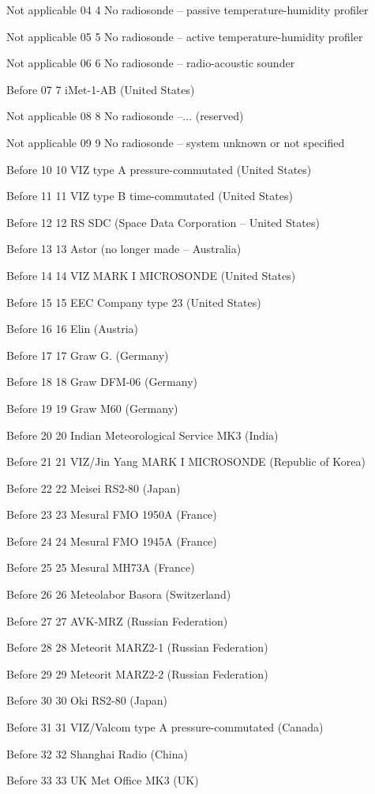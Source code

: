 Not applicable 04 4 No radiosonde -- passive temperature-humidity profiler

Not applicable 05 5 No radiosonde -- active temperature-humidity profiler

Not applicable 06 6 No radiosonde -- radio-acoustic sounder

Before 07 7 iMet-1-AB (United States)

Not applicable 08 8 No radiosonde --... (reserved)

Not applicable 09 9 No radiosonde -- system unknown or not specified

Before 10 10 VIZ type A pressure-commutated (United States)

Before 11 11 VIZ type B time-commutated (United States)

Before 12 12 RS SDC (Space Data Corporation -- United States)

Before 13 13 Astor (no longer made -- Australia)

Before 14 14 VIZ MARK I MICROSONDE (United States)

Before 15 15 EEC Company type 23 (United States)

Before 16 16 Elin (Austria)

Before 17 17 Graw G. (Germany)

Before 18 18 Graw DFM-06 (Germany)

Before 19 19 Graw M60 (Germany)

Before 20 20 Indian Meteorological Service MK3 (India)

Before 21 21 VIZ/Jin Yang MARK I MICROSONDE (Republic of Korea)

Before 22 22 Meisei RS2-80 (Japan)

Before 23 23 Mesural FMO 1950A (France)

Before 24 24 Mesural FMO 1945A (France)

Before 25 25 Mesural MH73A (France)

Before 26 26 Meteolabor Basora (Switzerland)

Before 27 27 AVK-MRZ (Russian Federation)

Before 28 28 Meteorit MARZ2-1 (Russian Federation)

Before 29 29 Meteorit MARZ2-2 (Russian Federation)

Before 30 30 Oki RS2-80 (Japan)

Before 31 31 VIZ/Valcom type A pressure-commutated (Canada)

Before 32 32 Shanghai Radio (China)

Before 33 33 UK Met Office MK3 (UK)

